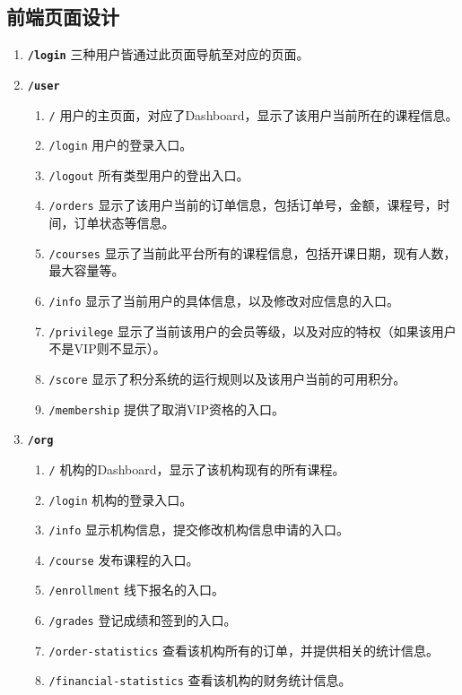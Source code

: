 \documentclass[11pt]{article}
\begin{document}
\subsection{前端页面设计}
\begin{enumerate}
  \item \textbf{\texttt{/login}} 三种用户皆通过此页面导航至对应的页面。
  \item \textbf{\texttt{/user}}
    \begin{enumerate}
      \item \texttt{/} 用户的主页面，对应了Dashboard，显示了该用户当前所在的课程信息。
      \item \texttt{/login} 用户的登录入口。
      \item \texttt{/logout} 所有类型用户的登出入口。
      \item \texttt{/orders} 显示了该用户当前的订单信息，包括订单号，金额，课程号，时间，订单状态等信息。
      \item \texttt{/courses} 显示了当前此平台所有的课程信息，包括开课日期，现有人数，最大容量等。
      \item \texttt{/info} 显示了当前用户的具体信息，以及修改对应信息的入口。 
      \item \texttt{/privilege} 显示了当前该用户的会员等级，以及对应的特权（如果该用户不是VIP则不显示）。 
      \item \texttt{/score} 显示了积分系统的运行规则以及该用户当前的可用积分。 
      \item \texttt{/membership} 提供了取消VIP资格的入口。
    \end{enumerate}
  \item \textbf{\texttt{/org}}
    \begin{enumerate}
      \item \texttt{/} 机构的Dashboard，显示了该机构现有的所有课程。
      \item \texttt{/login} 机构的登录入口。
      \item \texttt{/info} 显示机构信息，提交修改机构信息申请的入口。
      \item \texttt{/course} 发布课程的入口。
      \item \texttt{/enrollment} 线下报名的入口。
      \item \texttt{/grades} 登记成绩和签到的入口。
      \item \texttt{/order-statistics} 查看该机构所有的订单，并提供相关的统计信息。
      \item \texttt{/financial-statistics} 查看该机构的财务统计信息。
    \end{enumerate}

\end{enumerate}
\end{document}
